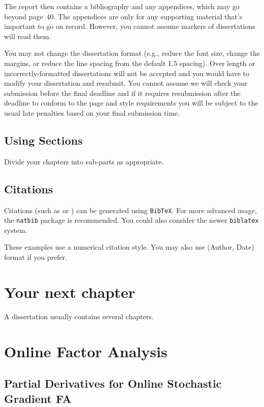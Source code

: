 \documentclass[msc,deptreport.inf]{infthesis} %
\begin{document}
The report then contains a bibliography and any appendices, which may go beyond
page~40. The appendices are only for any supporting material that's important to
go on record. However, you cannot assume markers of dissertations will read them.

You may not change the dissertation format (e.g., reduce the font
size, change the margins, or reduce the line spacing from the default
1.5 spacing). Over length or incorrectly-formatted dissertations will
not be accepted and you would have to modify your dissertation and
resubmit.  You cannot assume we will check your submission before the
final deadline and if it requires resubmission after the deadline to
conform to the page and style requirements you will be subject to the
usual late penalties based on your final submission time.

\section{Using Sections}

Divide your chapters into sub-parts as appropriate.

\section{Citations}

Citations (such as \cite{P1} or \cite{P2}) can be generated using
\texttt{BibTeX}. For more advanced usage, the \texttt{natbib} package is
recommended. You could also consider the newer \texttt{biblatex} system.

These examples use a numerical citation style. You may also use
(Author, Date) format if you prefer.

\chapter{Your next chapter}

A dissertation usually contains several chapters.

\chapter{Online Factor Analysis}

\section{Partial Derivatives for Online Stochastic Gradient FA}
\end{document}
